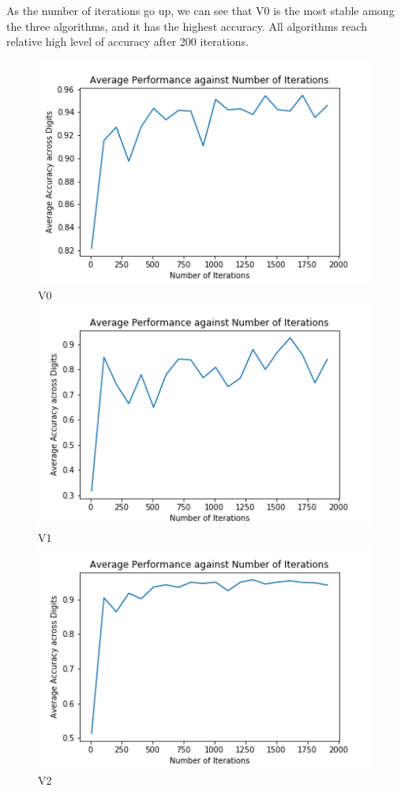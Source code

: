 \documentclass[twoside,11pt]{homework}
\begin{document}
	As the number of iterations go up, we can see that V0 is the most stable among the three algorithms, and it has the highest accuracy.
	All algorithms reach relative high level of accuracy after 200 iterations.
	\begin{figure}[H]
		\includegraphics[scale=0.6]{q6/img/iterations_v0.png}V0\\
		\includegraphics[scale=0.6]{q6/img/iterations_v1.png}V1\\
		\includegraphics[scale=0.6]{q6/img/iterations_v2.png}V2
	\end{figure}
\end{document}
